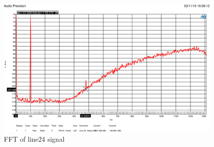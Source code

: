 \documentclass[11pt]{report}
\begin{document}
\begin{figure}[htbp]
\begin{center}
\includegraphics[width=14cm,keepaspectratio=true]{FFTrauschen}
\caption{FFT of line24 signal}
\label{fig:fft}
\end{center}
\end{figure}
\end{document}
